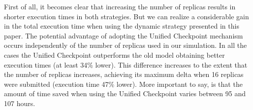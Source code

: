 \documentclass[times, 09pt, twocolumn]{article}
\begin{document}
First of all, it becomes clear that increasing the number of replicas results
in shorter execution times in both strategies. But we can realize a
considerable gain in the total execution time when using the dynamic strategy
presented in this paper. The potential advantage of adopting the
Unified Checkpoint mechanism occurs independently of the number of replicas used in our
simulation. In all the cases the Unified Checkpoint outperforms the old model
obtaining better execution times (at least 34\% lower). This difference
increases to the extent that the number of replicas increases, achieving its
maximum delta when 16 replicas were submitted (execution time 47\% lower). More
important to say, is that the amount of time saved when using the Unified
Checkpoint varies between 95 and 107 hours. 
%
%
%
%   
% 
%
\end{document}
